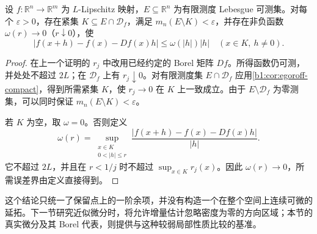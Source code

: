 \begin{proposition}\label{b1:prop:uniform-linearization-large-set}
设 \(f:\mathbb R^n\rightarrow\mathbb R^m\) 为 \(L\)-Lipschitz 映射，\(E\subseteq\mathbb R^n\) 为有限测度 Lebesgue 可测集。对每个 \(\varepsilon>0\)，存在紧集 \(K\subseteq E\cap\mathcal D_f\)，满足 \(m_n(E\setminus K)<\varepsilon\)，并存在非负函数 \(\omega(r)\to0\)（\(r\downarrow0\)），使
\[
 |f(x+h)-f(x)-Df(x)h|
 \leq\omega(|h|)|h|
 \quad(x\in K,\ h\ne0).
\]
\end{proposition}
\begin{proof}
在上一个证明的 \(r_j\) 中改用已经约定的 Borel 矩阵 \(Df\)。所得函数仍可测，并处处不超过 \(2L\)；在 \(\mathcal D_f\) 上有 \(r_j\downarrow0\)。对有限测度集 \(E\cap\mathcal D_f\) 应用\cref{b1:cor:egoroff-compact}，得到所需紧集 \(K\)，使 \(r_j\to0\) 在 \(K\) 上一致成立。由于 \(E\setminus\mathcal D_f\) 为零测集，可以同时保证 \(m_n(E\setminus K)<\varepsilon\)。

若 \(K\) 为空，取 \(\omega=0\)。否则定义
\[
 \omega(r)=
 \sup_{\substack{x\in K\\0<|h|\leq r}}
       \frac{|f(x+h)-f(x)-Df(x)h|}{|h|}.
\]
它不超过 \(2L\)，并且在 \(r<1/j\) 时不超过 \(\sup_{x\in K}r_j(x)\)。因此 \(\omega(r)\to0\)，所需误差界由定义直接得到。
\end{proof}

这个结论只统一了保留点上的一阶余项，并没有构造一个在整个空间上连续可微的延拓。下一节研究近似微分时，将允许增量估计忽略密度为零的方向区域；本节的真实微分及其 Borel 代表，则提供与这种较弱局部性质比较的基准。
